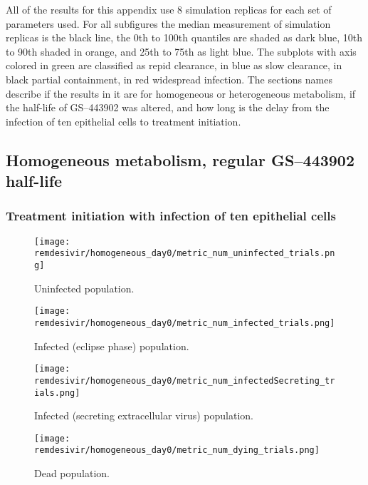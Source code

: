 
All of the results for this appendix use 8 simulation replicas for each set of parameters used. For all subfigures the median measurement of simulation replicas is the black line, the 0th to 100th quantiles are shaded as dark blue, 10th to 90th shaded in orange, and 25th to 75th as light blue. The subplots with axis colored in green are classified as repid clearance, in blue as slow clearance, in black partial containment, in red widespread infection. The sections names describe if the results in it are for homogeneous or heterogeneous metabolism, if the half-life of GS--443902 was altered, and how long is the delay from the infection of ten epithelial cells to treatment initiation.



\subsection{Homogeneous metabolism, regular GS--443902 half-life}\label{sup:sec:extra_figures:homo_regular}
\subsubsection{Treatment initiation with infection of ten epithelial cells}\label{sup:sec:extra_figures:homo_regular:day0}

\begin{figure}[H]
\texttt{[image: remdesivir/homogeneous\_day0/metric\_num\_uninfected\_trials.png]}
\caption{Uninfected population.\label{fig:app:homo_regular:day0:uninf}}
\end{figure}

\begin{figure}[H]
\texttt{[image: remdesivir/homogeneous\_day0/metric\_num\_infected\_trials.png]}
\caption{Infected (eclipse phase) population.\label{fig:app:homo_regular:day0:inf}}
\end{figure}

\begin{figure}[H]
\texttt{[image: remdesivir/homogeneous\_day0/metric\_num\_infectedSecreting\_trials.png]}
\caption{Infected (secreting extracellular virus) population.\label{fig:app:homo_regular:day0:infSecr}}
\end{figure}

\begin{figure}[H]
\texttt{[image: remdesivir/homogeneous\_day0/metric\_num\_dying\_trials.png]}
\caption{Dead population.\label{fig:app:homo_regular:day0:dead}}
\end{figure}

